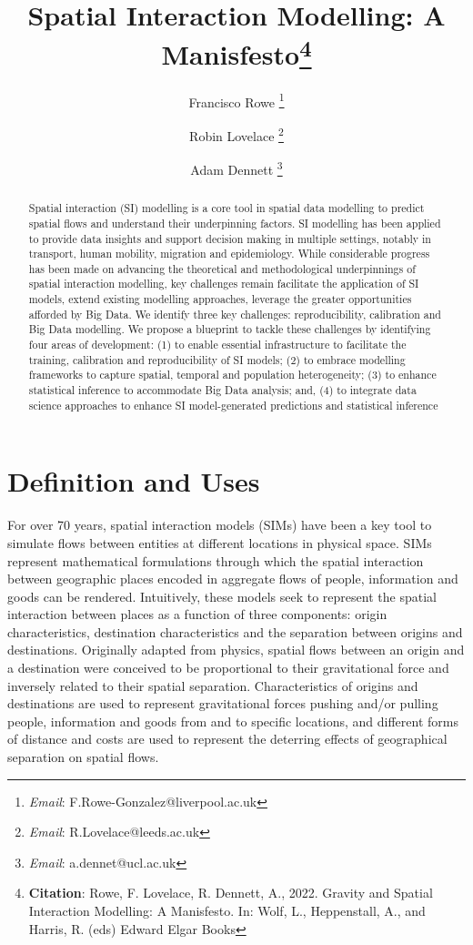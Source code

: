 \documentclass[11pt,letterpaper]{article}
\title{Spatial Interaction Modelling: A Manisfesto\footnote{\textbf{Citation}: Rowe, F. Lovelace, R. Dennett, A., 2022. Gravity and Spatial Interaction Modelling: A Manisfesto. In: Wolf, L., Heppenstall, A., and Harris, R. (eds) Edward Elgar Books}}
\author[1]{Francisco Rowe \thanks{\textit{Email}: F.Rowe-Gonzalez@liverpool.ac.uk}}
\affil[1]{Geographic Data Science Lab, Department of Geography and Planning, University of Liverpool, Liverpool, United Kingdom}
\author[2]{Robin Lovelace \thanks{\textit{Email}: R.Lovelace@leeds.ac.uk}}
\affil[2]{Institute for Transport Studies, University of Leeds, Leeds, United Kingdom}
\author[3]{Adam Dennett \thanks{\textit{Email}: a.dennet@ucl.ac.uk}}
\affil[3]{The Bartlett Centre for Advanced Spatial Analytics, University College London, London, United Kingdom}
\date{}
\begin{document}
\maketitle



\begin{abstract}

Spatial interaction (SI) modelling is a core tool in spatial data modelling to predict spatial flows and understand their underpinning factors. 
SI modelling has been applied to provide data insights and support decision making in multiple settings, notably in transport, human mobility, migration and epidemiology. 
While considerable progress has been made on advancing the theoretical and methodological underpinnings of spatial interaction modelling, key challenges remain facilitate the application of SI models, extend existing modelling approaches, leverage the greater opportunities afforded by Big Data.
We identify three key challenges: reproducibility, calibration and Big Data modelling. 
We propose a blueprint to tackle these challenges by identifying four areas of development: 
(1) to enable essential infrastructure to facilitate the training, calibration and reproducibility of SI models; 
(2) to embrace modelling frameworks to capture spatial, temporal and population heterogeneity; 
(3) to enhance statistical inference to accommodate Big Data analysis; and, 
(4) to integrate data science approaches to enhance SI model-generated predictions and statistical inference

\end{abstract}



\pagebreak

\hypertarget{definition-and-uses}{%
\section{Definition and Uses}\label{definition-and-uses}}

For over 70 years, spatial interaction models (SIMs) have been a key tool to simulate flows between entities at different locations in physical space.
SIMs represent mathematical formulations through which the spatial interaction between geographic places encoded in aggregate flows of people, information and goods can be rendered.
Intuitively, these models seek to represent the spatial interaction between places as a function of three components: origin characteristics, destination characteristics and the separation between origins and destinations.
Originally adapted from physics, spatial flows between an origin and a destination were conceived to be proportional to their gravitational force and inversely related to their spatial separation.
Characteristics of origins and destinations are used to represent gravitational forces pushing and/or pulling people, information and goods from and to specific locations, and different forms of distance and costs are used to represent the deterring effects of geographical separation on spatial flows.
\end{document}
